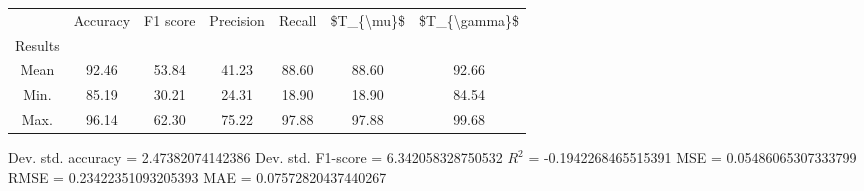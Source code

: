 \begin{tabular}{|c|c|c|c|c|c|c|}
\toprule
{} &  Accuracy &  F1 score &  Precision &  Recall &  \$T\_\{\textbackslash mu\}\$ &  \$T\_\{\textbackslash gamma\}\$ \\
Results &           &           &            &         &            &               \\
\hline
Mean    &     92.46 &     53.84 &      41.23 &   88.60 &      88.60 &         92.66 \\
Min.    &     85.19 &     30.21 &      24.31 &   18.90 &      18.90 &         84.54 \\
Max.    &     96.14 &     62.30 &      75.22 &   97.88 &      97.88 &         99.68 \\
\bottomrule
\end{tabular}

 Dev. std. accuracy = 2.47382074142386
 Dev. std. F1-score = 6.342058328750532
 $R^2$ = -0.1942268465515391
 MSE = 0.05486065307333799
 RMSE = 0.23422351093205393
 MAE = 0.07572820437440267